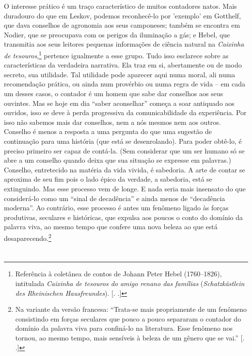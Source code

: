 O interesse prático é um traço característico de muitos contadores
natos. Mais duradouro do que em Leskov, podemos reconhecê-lo por 'exemplo'
em Gotthelf, que dava conselhos de agronomia aos seus camponeses; também
se encontra em Nodier, que se preocupava com os perigos da iluminação a
gás; e Hebel, que transmitia aos seus leitores pequenas informações de
ciência natural na \emph{Caixinha de tesouros},\footnote{Referência à
  coletânea de contos de Johann Peter Hebel (1760--1826), intitulada
  \emph{Caixinha de tesouros do amigo renano das famílias}
  (\emph{Schatzkästlein des Rheinischen Hausfreundes}). [. .]}
pertence igualmente a esse grupo. Tudo isso esclarece sobre as
características da verdadeira narrativa. Ela traz em si, abertamente ou
de modo secreto, sua utilidade. Tal utilidade pode aparecer aqui numa
moral, ali numa recomendação prática, ou ainda num provérbio ou numa
regra de vida -- em cada um desses casos, o contador é um homem que sabe
dar conselhos aos seus ouvintes. Mas se hoje em dia ``saber aconselhar''
começa a soar antiquado aos ouvidos, isso se deve à perda progressiva da
comunicabilidade da experiência. Por isso não sabemos mais dar
conselhos, nem a nós mesmos nem aos outros. Conselho é menos a resposta
a uma pergunta do que uma sugestão de continuação para uma história (que
está se desenrolando). Para poder obtê-lo, é preciso primeiro ser capaz
de contá-la. (Sem considerar que um ser humano só se abre a um conselho
quando deixa que sua situação se expresse em palavras.) Conselho,
entretecido na matéria da vida vivida, é sabedoria. A arte de contar se
aproxima de seu fim pois o lado épico da verdade\label{supra2}, a sabedoria, está se
extinguindo. Mas esse processo vem de longe. E nada seria mais insensato
do que considerá-lo como um ``sinal de decadência'' e ainda menos de
``decadência moderna''. Ao contrário, esse processo é antes um fenômeno
ligado às forças produtivas, seculares e históricas, que expulsa aos
poucos o conto do domínio da palavra viva, ao mesmo tempo que confere
uma nova beleza ao que está desaparecendo.\footnote{Na variante da
  versão francesa: ``Trata-se mais propriamente de um fenômeno
  consistindo em forças seculares que pouco a pouco separaram o contador
  do domínio da palavra viva para confiná-lo na literatura. Esse
  fenômeno nos tornou, ao mesmo tempo, mais sensíveis à beleza de um
  gênero que se vai.'' [. .]}

\section{}

